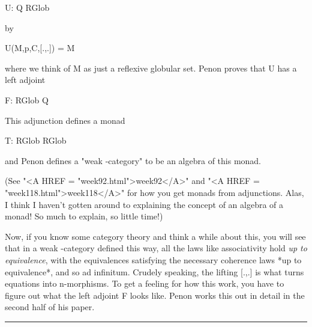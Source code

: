 U: Q \to  RGlob

by 

U(M,p,C,[.,.]) = M

where we think of M as just a reflexive globular set.  Penon
proves that U has a left adjoint

F: RGlob \to  Q

This adjunction defines a monad

T: RGlob \to  RGlob 

and Penon defines a "weak \omega -category" to be an algebra of this
monad.  

(See "<A HREF = "week92.html">week92</A>" and "<A HREF = "week118.html">week118</A>" for how you get monads from adjunctions.
Alas, I think I haven't gotten around to explaining the concept of an
algebra of a monad!  So much to explain, so little time!)

Now, if you know some category theory and think a while about this,
you will see that in a weak \omega -category defined this way, all
the laws like associativity hold \emph{up to equivalence}, with the
equivalences satisfying the necessary coherence laws *up to 
equivalence*, and so ad infinitum.  Crudely speaking, the 
lifting [.,.] is what turns equations into n-morphisms.  To get
a feeling for how this work, you have to figure out what the left
adjoint F looks like.  Penon works this out in detail in the second
half of his paper.  


 \par\noindent\rule{\textwidth}{0.4pt}

